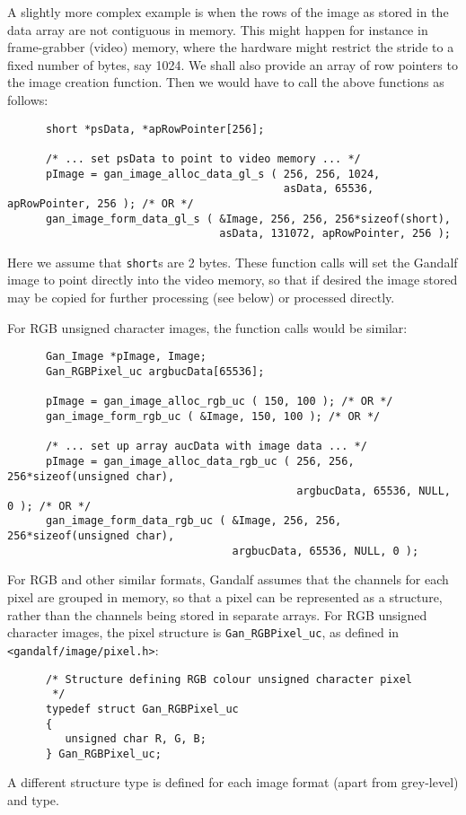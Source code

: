 A slightly more complex example is when the rows of the image as stored
in the data array are not contiguous in memory. This might happen for
instance in frame-grabber (video) memory, where the hardware might restrict
the stride to a fixed number of bytes, say 1024. We shall also provide
an array of row pointers to the image creation function. Then we would have to
call the above functions as follows:
\begin{verbatim}
      short *psData, *apRowPointer[256];

      /* ... set psData to point to video memory ... */
      pImage = gan_image_alloc_data_gl_s ( 256, 256, 1024,
                                           asData, 65536, apRowPointer, 256 ); /* OR */
      gan_image_form_data_gl_s ( &Image, 256, 256, 256*sizeof(short),
                                 asData, 131072, apRowPointer, 256 );
\end{verbatim}
Here we assume that {\tt short}s are 2 bytes. These function calls will
set the Gandalf image to point directly into the video memory, so that
if desired the image stored may be copied for further processing (see below)
or processed directly.

For RGB unsigned character images, the function calls would be similar:
\begin{verbatim}
      Gan_Image *pImage, Image;
      Gan_RGBPixel_uc argbucData[65536];

      pImage = gan_image_alloc_rgb_uc ( 150, 100 ); /* OR */
      gan_image_form_rgb_uc ( &Image, 150, 100 ); /* OR */

      /* ... set up array aucData with image data ... */
      pImage = gan_image_alloc_data_rgb_uc ( 256, 256, 256*sizeof(unsigned char),
                                             argbucData, 65536, NULL, 0 ); /* OR */
      gan_image_form_data_rgb_uc ( &Image, 256, 256, 256*sizeof(unsigned char),
                                   argbucData, 65536, NULL, 0 );
\end{verbatim}
For RGB and other similar formats, Gandalf assumes that the channels for
each pixel are grouped in memory, so that a pixel can be represented as
a structure, rather than the channels being stored in separate arrays.
For RGB unsigned character images, the pixel structure is
{\tt Gan\_RGBPixel\_uc}, as defined in {\tt <gandalf/image/pixel.h>}:
\begin{verbatim}
      /* Structure defining RGB colour unsigned character pixel
       */
      typedef struct Gan_RGBPixel_uc
      {
         unsigned char R, G, B;
      } Gan_RGBPixel_uc;
\end{verbatim}
A different structure type is defined for each image format
(apart from grey-level) and type.

